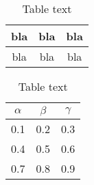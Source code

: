 \begin{table}[H]
\caption{Table text}
\centering
\begin{tabular}{|c|c|c|}
\hline
bla & bla & bla
\\
\hline 
bla & bla & bla
\\
\hline
\end{tabular}
\label{tab:tab1}
\end{table}

\begin{table}[H]
\caption{Table text}
\centering
{}
\begin{tabular}{ccc}
\hline
\hline 
$\alpha$ & $\beta$ & $\gamma$
\\
\hline 
\hline 
0.1 & 0.2 & 0.3
\\
0.4 & 0.5 & 0.6
\\
0.7 & 0.8 & 0.9
\\
\hline
\end{tabular}
\label{tab:tab1}
\end{table}
